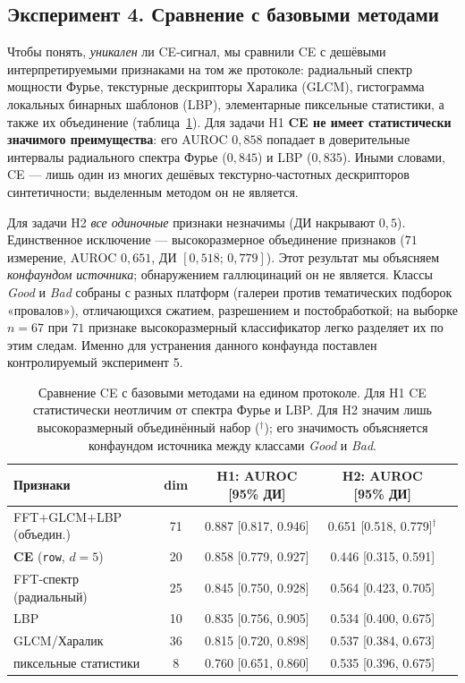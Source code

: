 \documentclass[14pt]{extarticle}
\theoremstyle{plain}
\numberwithin{equation}{section}
\numberwithin{figure}{section}
\numberwithin{table}{section}
\begin{document}
\subsection{Эксперимент 4. Сравнение с базовыми методами}\label{sec:baselines}
Чтобы понять, \emph{уникален} ли CE-сигнал, мы сравнили CE с дешёвыми
интерпретируемыми признаками на том же протоколе: радиальный спектр мощности
Фурье, текстурные дескрипторы Харалика (GLCM), гистограмма локальных бинарных
шаблонов (LBP), элементарные пиксельные статистики, а также их объединение
(таблица~\ref{tab:baselines}). Для задачи H1 \textbf{CE не имеет статистически
значимого преимущества}: его AUROC $0{,}858$ попадает в доверительные интервалы
радиального спектра Фурье ($0{,}845$) и LBP ($0{,}835$). Иными словами, CE — лишь
один из многих дешёвых текстурно-частотных дескрипторов синтетичности; выделенным
методом он не является.

Для задачи H2 \emph{все одиночные} признаки незначимы (ДИ накрывают $0{,}5$).
Единственное исключение — высокоразмерное объединение признаков
($71$ измерение, AUROC $0{,}651$, ДИ $[0{,}518;\,0{,}779]$). Этот результат мы
объясняем \emph{конфаундом источника}; обнаружением галлюцинаций он не является.
Классы \emph{Good} и \emph{Bad} собраны с разных платформ (галереи против
тематических подборок «провалов»), отличающихся сжатием, разрешением и
постобработкой; на выборке $n=67$ при $71$ признаке высокоразмерный классификатор
легко разделяет их по этим следам. Именно для устранения данного конфаунда
поставлен контролируемый эксперимент 5.

\begin{table}[h!]
\centering
\caption{Сравнение CE с базовыми методами на едином протоколе. Для H1 CE
статистически неотличим от спектра Фурье и LBP. Для H2 значим лишь
высокоразмерный объединённый набор ($^{\dagger}$); его значимость объясняется
конфаундом источника между классами \emph{Good} и \emph{Bad}.}
\label{tab:baselines}
\begin{tabular}{@{}lcccc@{}}
\toprule
Признаки & dim & H1: AUROC [95\% ДИ] & H2: AUROC [95\% ДИ] \\
\midrule
FFT$+$GLCM$+$LBP (объедин.) & 71 & 0.887 [0.817, 0.946] & 0.651 [0.518, 0.779]$^{\dagger}$ \\
\textbf{CE} (\texttt{row}, $d{=}5$) & 20 & 0.858 [0.779, 0.927] & 0.446 [0.315, 0.591] \\
FFT-спектр (радиальный)     & 25 & 0.845 [0.750, 0.928] & 0.564 [0.423, 0.705] \\
LBP                          & 10 & 0.835 [0.756, 0.905] & 0.534 [0.400, 0.675] \\
GLCM/Харалик                 & 36 & 0.815 [0.720, 0.898] & 0.537 [0.384, 0.673] \\
пиксельные статистики        & 8  & 0.760 [0.651, 0.860] & 0.535 [0.396, 0.675] \\
\bottomrule
\end{tabular}

\end{table}
\end{document}
